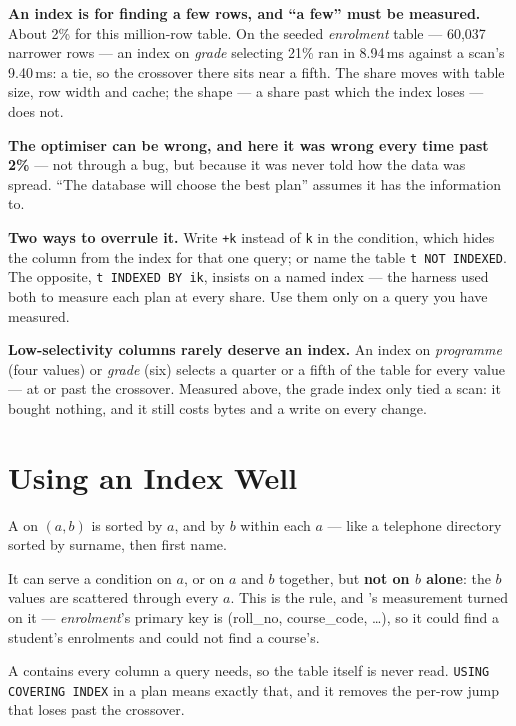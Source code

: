 \begin{alertbox}
\begin{tight}
  \item \textbf{An index is for finding a few rows, and ``a few'' must be
        measured.} About 2\% for this million-row table. On the seeded
        \textit{enrolment} table --- 60{,}037 narrower rows --- an index on
        \textit{grade} selecting 21\% ran in 8.94\,ms against a scan's
        9.40\,ms: a tie, so the crossover there sits near a fifth. The share
        moves with table size, row width and cache; the shape --- a share past
        which the index loses --- does not.
  \item \textbf{The optimiser can be wrong, and here it was wrong every time
        past 2\%} --- not through a bug, but because it was never told how the
        data was spread. ``The database will choose the best plan'' assumes it
        has the information to.
  \item \textbf{Two ways to overrule it.} Write \texttt{+k} instead of
        \texttt{k} in the condition, which hides the column from the index for
        that one query; or name the table \texttt{t NOT INDEXED}. The opposite,
        \texttt{t INDEXED BY ik}, insists on a named index --- the harness
        used both to measure each plan at every share. Use them only on a
        query you have measured.
  \item \textbf{Low-selectivity columns rarely deserve an index.} An index on
        \textit{programme} (four values) or \textit{grade} (six) selects a
        quarter or a fifth of the table for every value --- at or past the
        crossover. Measured above, the grade index only tied a scan: it bought
        nothing, and it still costs bytes and a write on every change.
\end{tight}
\end{alertbox}

\section{Using an Index Well}

\begin{definitionbox}
A  on $(a, b)$ is sorted by $a$, and by $b$ within each
$a$ --- like a telephone directory sorted by surname, then first name.

\smallskip
It can serve a condition on $a$, or on $a$ and $b$ together, but \textbf{not
on $b$ alone}: the $b$ values are scattered through every $a$. This is the
 rule, and 's measurement turned on it
--- \textit{enrolment}'s primary key is (roll\_no, course\_code, \dots), so it
could find a student's enrolments and could not find a course's.

\smallskip
A  contains every column a query needs, so the table
itself is never read. \texttt{USING COVERING INDEX} in a plan means exactly
that, and it removes the per-row jump that loses past the crossover.
\end{definitionbox}

